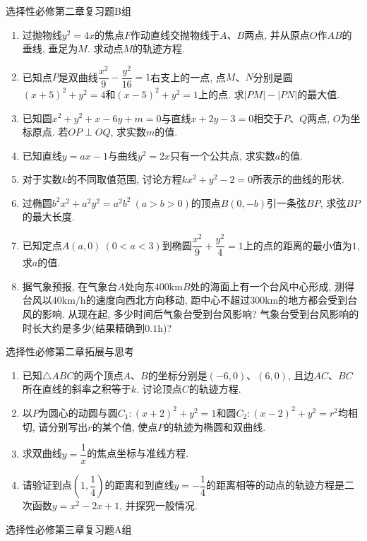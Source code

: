 \documentclass[10pt,a4paper]{article}
\begin{document}
选择性必修第二章复习题B组

\begin{enumerate}[1.]
\item 过抛物线$y^2=4x$的焦点$F$作动直线交抛物线于$A$、$B$两点, 并从原点$O$作$AB$的垂线, 垂足为$M$. 求动点$M$的轨迹方程.
\item 已知点$P$是双曲线$\dfrac{x^2}9-\dfrac{y^2}{16}=1$右支上的一点, 点$M$、$N$分别是圆$(x+5)^2+y^2=4$和$(x-5)^2+y^2=1$上的点. 求$|PM|-|PN|$的最大值.
\item 已知圆$x^2+y^2+x-6y+m=0$与直线$x+2y-3=0$相交于$P$、$Q$两点, $O$为坐标原点. 若$OP\perp OQ$, 求实数$m$的值.
\item 已知直线$y=ax-1$与曲线$y^2=2x$只有一个公共点, 求实数$a$的值.
\item 对于实数$k$的不同取值范围, 讨论方程$kx^2+y^2-2=0$所表示的曲线的形状.
\item 过椭圆$b^2x^2+a^2y^2=a^2b^2 \ (a>b>0)$的顶点$B(0, -b)$引一条弦$BP$, 求弦$BP$的最大长度.
\item 已知定点$A(a, 0) \ (0<a<3)$到椭圆$\dfrac{x^2}9+\dfrac{y^2}4=1$上的点的距离的最小值为$1$, 求$a$的值.
\item 据气象预报, 在气象台$A$处向东$400\text{km}B$处的海面上有一个台风中心形成, 测得台风以$40\text{km}/\text{h}$的速度向西北方向移动, 距中心不超过$300\text{km}$的地方都会受到台风的影响. 从现在起, 多少时间后气象台受到台风影响?  气象台受到台风影响的时长大约是多少(结果精确到$0.1\text{h}$)?
\end{enumerate}

选择性必修第二章拓展与思考

\begin{enumerate}[1.]
\item 已知$\triangle ABC$的两个顶点$A$、$B$的坐标分别是$(-6, 0)$、$(6, 0)$, 且边$AC$、$BC$所在直线的斜率之积等于$k$. 讨论顶点$C$的轨迹方程.
\item 以$P$为圆心的动圆与圆$C_1: (x+2)^2+y^2=1$和圆$C_2: (x-2)^2+y^2=r^2$均相切, 请分别写出$r$的某个值, 使点$P$的轨迹为椭圆和双曲线.
\item 求双曲线$y=\dfrac 1x$的焦点坐标与准线方程.
\item 请验证到点$(1, \dfrac 14)$的距离和到直线$y=-\dfrac 14$的距离相等的动点的轨迹方程是二次函数$y=x^2-2x+1$, 并探究一般情况. 
\end{enumerate}

选择性必修第三章复习题A组
\end{document}
